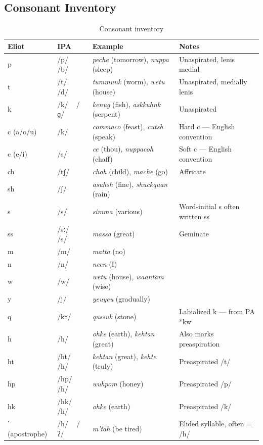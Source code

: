 \subsection{Consonant Inventory}

\begin{table}[h]
\centering
\begin{tabular}{llll}
\toprule
Eliot & IPA & Example & Notes \\
\midrule
p & /p/ ~ /b/ & \textit{peche} (tomorrow), \textit{nuppa} (sleep) & Unaspirated, lenis medial \\
t & /t/ ~ /d/ & \textit{tummunk} (worm), \textit{wetu} (house) & Unaspirated, medially lenis \\
k & /k/ ~ /ɡ/ & \textit{kenug} (fish), \textit{askkuhnk} (serpent) & Unaspirated \\
c (a/o/u) & /k/ & \textit{commaco} (feast), \textit{cutsh} (speak) & Hard c --- English convention \\
c (e/i) & /s/ & \textit{ce} (thou), \textit{nuppacoh} (chaff) & Soft c --- English convention \\
ch & /tʃ/ & \textit{choh} (child), \textit{mache} (go) & Affricate \\
sh & /ʃ/ & \textit{asuhsh} (fine), \textit{shuckquan} (rain) & \\
s & /s/ & \textit{simma} (various) & Word-initial s often written ss \\
ss & /sː/ ~ /s/ & \textit{massa} (great) & Geminate \\
m & /m/ & \textit{matta} (no) & \\
n & /n/ & \textit{neen} (I) & \\
w & /w/ & \textit{wetu} (house), \textit{waantam} (wise) & \\
y & /j/ & \textit{yeuyeu} (gradually) & \\
q & /kʷ/ & \textit{qussuk} (stone) & Labialized k --- from PA *kw \\
h & /h/ & \textit{ohke} (earth), \textit{kehtan} (great) & Also marks preaspiration \\
ht & /ht/ ~ /h/ & \textit{kehtan} (great), \textit{kehte} (truly) & Preaspirated /t/ \\
hp & /hp/ ~ /h/ & \textit{wuhpom} (honey) & Preaspirated /p/ \\
hk & /hk/ ~ /h/ & \textit{ohke} (earth) & Preaspirated /k/ \\
' (apostrophe) & /h/ ~ /ʔ/ & \textit{m'tah} (be tired) & Elided syllable, often = /h/ \\
\bottomrule
\end{tabular}
\caption{Consonant inventory}
\label{tab:1363-consonants}
\end{table}

